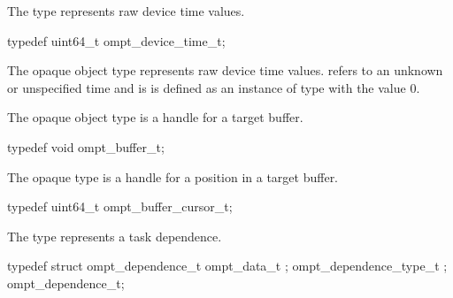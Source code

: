 \label{sec:ompt_device_time_t}

\summary
The  type represents raw device time values.

\format
\begin{ccppspecific}
\begin{omptOther}
typedef uint64_t ompt_device_time_t;
\end{omptOther}
\end{ccppspecific}

\descr
\label{sec:ompt_time_none}
The  opaque object type represents raw device time values.
 refers to an unknown or unspecified time and is is defined as 
an instance of type  with the value 0.



\label{sec:ompt_buffer_t}

\summary
The  opaque object type is a handle for a target buffer.

\format
\begin{ccppspecific}
\begin{omptOther}
typedef void ompt_buffer_t;
\end{omptOther}
\end{ccppspecific}



\label{sec:ompt_buffer_cursor_t}

\summary
The  opaque type is a handle for a position 
in a target buffer.

\format
\begin{ccppspecific}
\begin{omptOther}
typedef uint64_t ompt_buffer_cursor_t;
\end{omptOther}
\end{ccppspecific}



\label{sec:ompt_dependence_t}

\summary
The  type represents a task dependence.

\format
\begin{ccppspecific}
\begin{omptOther}
typedef struct ompt_dependence_t {
  ompt_data_t ;
  ompt_dependence_type_t ;
} ompt_dependence_t;
\end{omptOther}
\end{ccppspecific}

